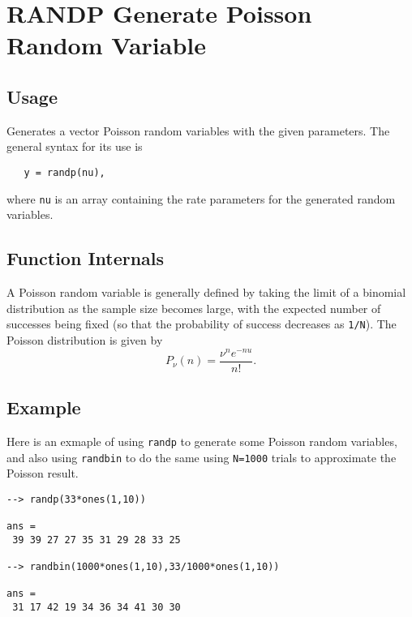 \section{RANDP Generate Poisson Random Variable}

\subsection{Usage}

Generates a vector Poisson random variables with the given
parameters.  The general syntax for its use is
\begin{verbatim}
   y = randp(nu),
\end{verbatim}
where \verb|nu| is an array containing the rate parameters
for the generated random variables.  
\subsection{Function Internals}

A Poisson random variable is generally defined by taking the
limit of a binomial distribution as the sample size becomes
large, with the expected number of successes being fixed (so
that the probability of success decreases as \verb|1/N|).  
The Poisson distribution is given by
\[
  P_{\nu}(n) = \frac{\nu^n e^{-nu}}{n!}.
\]
\subsection{Example}

Here is an exmaple of using \verb|randp| to generate some Poisson
random variables, and also using \verb|randbin| to do the same
using \verb|N=1000| trials to approximate the Poisson result.
\begin{verbatim}
--> randp(33*ones(1,10))

ans = 
 39 39 27 27 35 31 29 28 33 25 

--> randbin(1000*ones(1,10),33/1000*ones(1,10))

ans = 
 31 17 42 19 34 36 34 41 30 30 
\end{verbatim}
